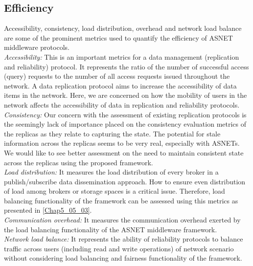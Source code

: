 \subsection{Efficiency}\label{Chap3_03_02}
Accessibility, consistency, load distribution, overhead and network load balance are some of the prominent metrics used to quantify the efficiency of ASNET middleware protocols. \\
\emph{Accessibility:} This is an important metrics for a data management (replication and reliability) protocol. It represents the ratio of the number of successful access (query) requests to the number of all access requests issued throughout the network. A data replication protocol aims to increase the accessibility of data items in the network. Here, we are concerned on how the mobility of users in the network affects the accessibility of data in replication and reliability protocols. \\
\emph{Consistency:} Our concern with the assessment of existing replication protocols is the seemingly lack of importance placed on the consistency evaluation metrics of the replicas as they relate to capturing the state. The potential for stale information across the replicas seems to be very real, especially with ASNETs. We would like to see better assessment on the need to maintain consistent state across the replicas using the proposed framework.\\
\emph{Load distribution:} It measures the load distribution of every broker in a publish/subscribe data dissemination approach. How to ensure even distribution of load among brokers or storage spaces is a critical issue. Therefore, load balancing functionality of the framework can be assessed using this metrics as presented in \ref{Chap5_05_03}. \\
\emph{Communication overhead:} It measures the communication overhead exerted by the load balancing functionality of the ASNET middleware framework. \\
\emph{Network load balance:} It represents the ability of reliability protocols to balance traffic across users (including read and write operations) of network scenario without considering load balancing and fairness functionality of the framework.\\

